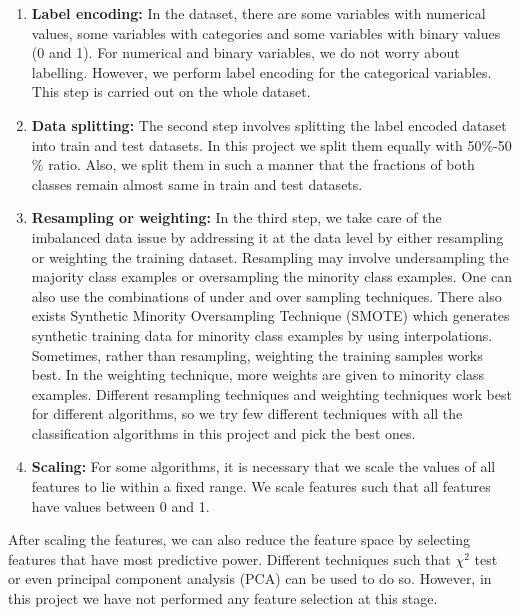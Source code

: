 \documentclass[12pt]{article}
\begin{document}
\begin{enumerate}  
\item \textbf{Label encoding:} In the dataset, there are some variables with numerical values, some variables with categories and some variables with binary values (0 and 1). For numerical and binary variables, we do not worry about labelling. However, we perform label encoding for the categorical variables. This step is carried out on the whole dataset. 
\item \textbf{Data splitting:} The second step involves splitting the label encoded dataset into train and test datasets. In this project we split them equally with 50$\%$-50$\%$ ratio. Also, we split them in such a manner that the fractions of both classes remain almost same in train and test datasets.
\item \textbf{Resampling or weighting:} In the third step, we take care of the imbalanced data issue by addressing it at the data level by either resampling or weighting the training dataset. Resampling may involve undersampling the majority class examples or oversampling the minority class examples. One can also use the combinations of under and over sampling techniques. There also exists Synthetic Minority Oversampling Technique (SMOTE) which generates synthetic training data for minority class examples by using interpolations. Sometimes, rather than resampling, weighting the training samples works best. In the weighting technique, more weights are given to minority class examples. Different resampling techniques and weighting techniques work best for different algorithms, so we try few different techniques with all the classification algorithms in this project and pick the best ones.  
\item \textbf{Scaling:} For some algorithms, it is necessary that we scale the values of all features to lie within a fixed range. We scale features such that all features have values between 0 and 1. 
\end{enumerate}

After scaling the features, we can also reduce the feature space by selecting features that have most predictive power. Different techniques such that $\chi^2$ test or even principal component analysis (PCA) can be used to do so. However, in this project we have not performed any feature selection at this stage. 
\end{document}
